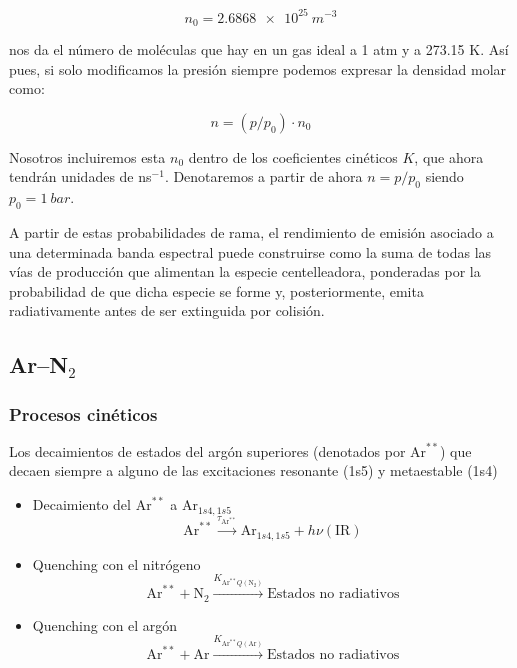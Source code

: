 \documentclass[12pt,a4paper]{article}
\newcommand{\N}{\mathrm{N}}
\newcommand{\Ar}{\mathrm{Ar}}
\begin{document}
$$ n_0 = \SI{2.6868e25}{m^{-3}} $$

nos da el número de moléculas que hay en un gas ideal a 1 atm y a 273.15 K. Así pues, si solo modificamos la presión siempre podemos expresar la densidad molar como:  

$$ n = (p/p_0) \cdot  n_0 $$

Nosotros incluiremos esta $n_0$ dentro de los coeficientes cinéticos $K$, que ahora tendrán unidades de ns$^{-1}$. Denotaremos a partir de ahora $n=p/p_0$ siendo $p_0 = \SI{1}{bar}$.

A partir de estas probabilidades de rama, el rendimiento de emisión asociado a una determinada banda espectral puede construirse como la suma de todas las vías de producción que alimentan la especie centelleadora, ponderadas por la probabilidad de que dicha especie se forme y, posteriormente, emita radiativamente antes de ser extinguida por colisión. 

\subsection{Ar--N$_2$} \label{subbsec:kinArN2}


\subsubsection{Procesos cinéticos}

Los decaimientos de estados del argón superiores (denotados por $\Ar^{**}$) que decaen siempre a alguno de las excitaciones resonante (1s5) y metaestable (1s4)

\begin{itemize}
    \item Decaimiento del $\Ar^{**}$ a $\Ar_{1s4,1s5}$
    \begin{equation}
        \Ar^{**} 
        \xrightarrow{\tau_{\Ar^{**}}}  \Ar_{1s4,1s5} + h \nu (\text{IR})
    \end{equation}
    \item Quenching con el nitrógeno
    \begin{equation}
        \Ar^{**} + \N_2
        \xrightarrow{K_{\Ar^{**}Q(\N_2)}}  \text{Estados no radiativos}
    \end{equation}
    \item Quenching con el argón
    \begin{equation}
        \Ar^{**} + \Ar
        \xrightarrow{K_{\Ar^{**}Q(\Ar)}}  \text{Estados no radiativos}
    \end{equation}
\end{itemize}
\end{document}
